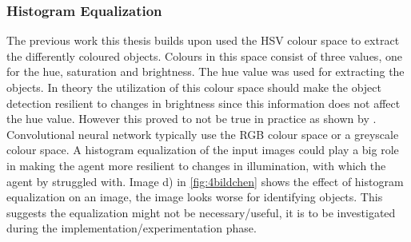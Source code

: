 \subsubsection{Histogram Equalization}

The previous work this thesis builds upon used the HSV colour space to extract the differently coloured objects. Colours in this space consist of three values, one for the hue, saturation and brightness. The hue value was used for extracting the objects. In theory the utilization of this colour space should make the object detection resilient to changes in brightness since this information does not affect the hue value. However this proved to not be true in practice as shown by \autocite{maximilian}.
Convolutional neural network typically use the RGB colour space or a greyscale colour space. A histogram equalization of the input images could play a big role in making the agent more resilient to changes in illumination, with which the agent by \autocite{maximilian} struggled with. Image d) in \ref{fig:4bildchen} shows the effect of histogram equalization on an image, the image looks worse for identifying objects. This suggests the equalization might not be necessary/useful, it is to be investigated during the implementation/experimentation phase.




